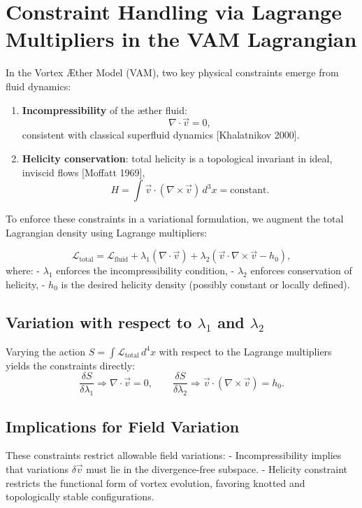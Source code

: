 \section{Constraint Handling via Lagrange Multipliers in the VAM Lagrangian}

In the Vortex Æther Model (VAM), two key physical constraints emerge from fluid dynamics:

\begin{enumerate}
    \item \textbf{Incompressibility} of the æther fluid:
    \[
        \nabla \cdot \vec{v} = 0,
    \]
    consistent with classical superfluid dynamics [Khalatnikov 2000].

    \item \textbf{Helicity conservation}: total helicity is a topological invariant in ideal, inviscid flows [Moffatt 1969],
    \[
        H = \int \vec{v} \cdot (\nabla \times \vec{v})\, d^3x = \text{constant}.
    \]
\end{enumerate}

To enforce these constraints in a variational formulation, we augment the total Lagrangian density using Lagrange multipliers:

\[
    \mathcal{L}_{\text{total}} = \mathcal{L}_{\text{fluid}} + \lambda_1 (\nabla \cdot \vec{v}) + \lambda_2 (\vec{v} \cdot \nabla \times \vec{v} - h_0),
\]
where:
- \( \lambda_1 \) enforces the incompressibility condition,
- \( \lambda_2 \) enforces conservation of helicity,
- \( h_0 \) is the desired helicity density (possibly constant or locally defined).

\subsection*{Variation with respect to $\lambda_1$ and $\lambda_2$}

Varying the action \( S = \int \mathcal{L}_{\text{total}}\, d^4x \) with respect to the Lagrange multipliers yields the constraints directly:
\[
    \frac{\delta S}{\delta \lambda_1} \Rightarrow \nabla \cdot \vec{v} = 0,
    \qquad
    \frac{\delta S}{\delta \lambda_2} \Rightarrow \vec{v} \cdot (\nabla \times \vec{v}) = h_0.
\]

\subsection*{Implications for Field Variation}

These constraints restrict allowable field variations:
- Incompressibility implies that variations \( \delta \vec{v} \) must lie in the divergence-free subspace.
- Helicity constraint restricts the functional form of vortex evolution, favoring knotted and topologically stable configurations.

